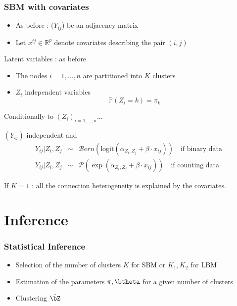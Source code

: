 \documentclass[compress,10pt]{beamer}
\begin{document}
\begin{frame}\frametitle{SBM with covariates}

\begin{itemize}
\item As before :  ($Y_{ij}$) be an adjacency matrix 
\item  Let   $x^{ij} \in \mathbb{R}^p$  denote covariates describing the pair $(i,j)$
\end{itemize}

\begin{block}{Latent variables : as before }
\begin{itemize}
\item The nodes $i= 1,\dots,n$ are partitioned into $K$ clusters
\item $Z_i$ independent variables
$$ \mathbb{P}(Z_i = k) = \pi_k$$
\end{itemize}
\end{block}
 
\begin{block}{Conditionally to $(Z_i)_{i=1,\dots,n}$... }

$(Y_{ij})$ independent and 
\begin{eqnarray*}
 Y_{ij}  | Z_i, Z_j&\sim&   \mathcal{B}ern(\mbox{logit}(\alpha_{Z_i,Z_j} + \beta \cdot x_{ij}) ) \quad \mbox {if binary data} \\
 Y_{ij}  | Z_i, Z_j  &\sim&  \mathcal{P}(\exp(\alpha_{Z_i,Z_j} + \beta  \cdot x_{ij}) ) \quad \mbox {if counting data} 
\end{eqnarray*}
\end{block}


If $K = 1$ : all the connection heterogeneity is explained by the covariates. 
 \end{frame}

\section{Inference}
\begin{frame}\frametitle{Statistical Inference}
\begin{itemize}
\item Selection of the number of clusters $K$ for SBM  or $K_1,K_2$ for LBM
\item Estimation of the parameters $\mathbf{\pi}, \btheta$ for a given number of clusters
\item Clustering $\hat \bZ$
\end{itemize}

\end{frame}
\end{document}
